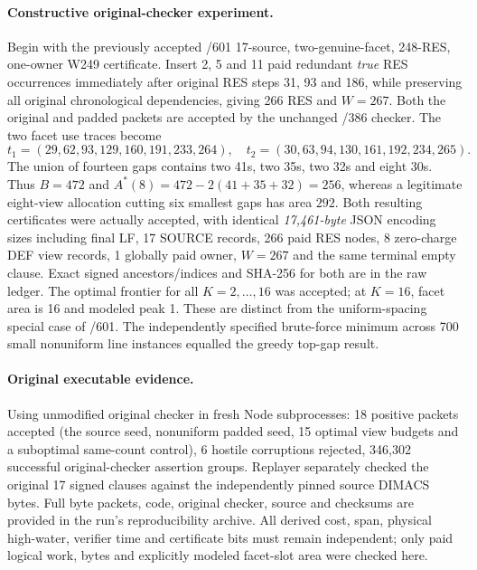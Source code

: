 \paragraph{Constructive original-checker experiment.}
Begin with the previously accepted /601 17-source, two-genuine-facet, 248-RES, one-owner W249 certificate. Insert 2, 5 and 11 paid redundant \emph{true} RES occurrences immediately after original RES steps 31, 93 and 186, while preserving all original chronological dependencies, giving 266 RES and $W=267$. Both the original and padded packets are accepted by the unchanged /386 checker. The two facet use traces become
\[
 t_1=(29,62,93,129,160,191,233,264),\quad
 t_2=(30,63,94,130,161,192,234,265).
\]
The union of fourteen gaps contains two 41s, two 35s, two 32s and eight 30s. Thus $B=472$ and $A^*(8)=472-2(41+35+32)=256$, whereas a legitimate eight-view allocation cutting six smallest gaps has area $292$. Both resulting certificates were actually accepted, with identical \emph{17,461-byte} JSON encoding sizes including final LF, 17 SOURCE records, 266 paid RES nodes, 8 zero-charge DEF view records, 1 globally paid owner, $W=267$ and the same terminal empty clause. Exact signed ancestors/indices and SHA-256 for both are in the raw ledger. The optimal frontier for all $K=2,\ldots,16$ was accepted; at $K=16$, facet area is 16 and modeled peak 1. These are distinct from the uniform-spacing special case of /601. The independently specified brute-force minimum across 700 small nonuniform line instances equalled the greedy top-gap result.

\paragraph{Original executable evidence.}
Using unmodified original checker in fresh Node subprocesses: 18 positive packets accepted (the source seed, nonuniform padded seed, 15 optimal view budgets and a suboptimal same-count control), 6 hostile corruptions rejected, 346,302 successful original-checker assertion groups. Replayer separately checked the original 17 signed clauses against the independently pinned source DIMACS bytes. Full byte packets, code, original checker, source and checksums are provided in the run's reproducibility archive. All derived cost, span, physical high-water, verifier time and certificate bits must remain independent; only paid logical work, bytes and explicitly modeled facet-slot area were checked here.

